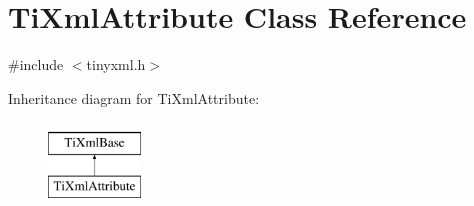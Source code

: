 \hypertarget{classTiXmlAttribute}{\section{\-Ti\-Xml\-Attribute \-Class \-Reference}
\label{classTiXmlAttribute}
}


{\ttfamily \#include $<$tinyxml.\-h$>$}

\-Inheritance diagram for \-Ti\-Xml\-Attribute\-:\begin{figure}[H]
\begin{center}
\leavevmode
\includegraphics[height=2.000000cm]{classTiXmlAttribute}
\end{center}
\end{figure}
